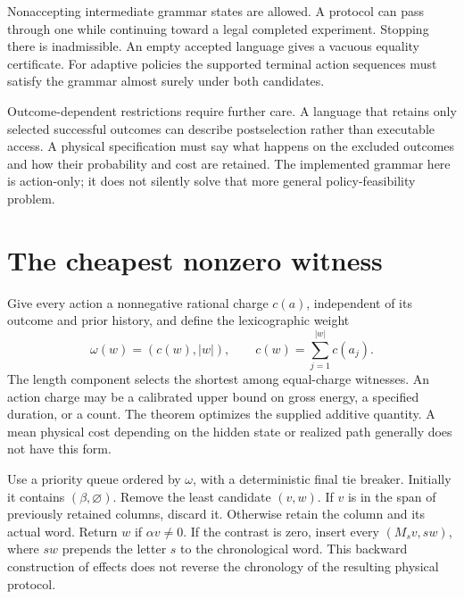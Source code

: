 Nonaccepting intermediate grammar states are allowed. A protocol can pass
through one while continuing toward a legal completed experiment. Stopping
there is inadmissible. An empty accepted language gives a vacuous equality
certificate. For adaptive policies the supported terminal action sequences
must satisfy the grammar almost surely under both candidates.

Outcome-dependent restrictions require further care. A language that
retains only selected successful outcomes can describe postselection rather
than executable access. A physical specification must say what happens on
the excluded outcomes and how their probability and cost are retained.
The implemented grammar here is action-only; it does not silently solve
that more general policy-feasibility problem.

\section{The cheapest nonzero witness}

Give every action a nonnegative rational charge $c(a)$, independent of its
outcome and prior history, and define the lexicographic weight
\begin{equation}\label{finite:weight}
 \omega(w)=\left(c(w),|w|\right),\qquad
 c(w)=\sum_{j=1}^{|w|}c(a_j).
\end{equation}
The length component selects the shortest among equal-charge witnesses.
An action charge may be a calibrated upper bound on gross energy, a
specified duration, or a count. The theorem optimizes the supplied
additive quantity. A mean physical cost depending on the hidden state or
realized path generally does not have this form.

Use a priority queue ordered by $\omega$, with a deterministic final tie
breaker. Initially it contains $(\beta,\varnothing)$. Remove the least
candidate $(v,w)$. If $v$ is in the span of previously retained columns,
discard it. Otherwise retain the column and its actual word. Return $w$
if $\alpha v\ne0$. If the contrast is zero, insert every
$(M_s v,sw)$, where $sw$ prepends the letter $s$ to the chronological
word. This backward construction of effects does not reverse the
chronology of the resulting physical protocol.

